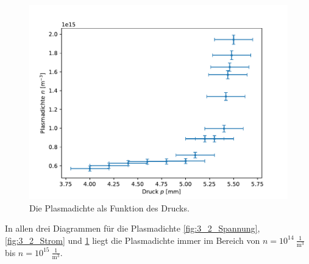 \begin{figure}[H]
\centering
\includegraphics[scale=0.6]{3_2_Druck.pdf}
\caption{Die Plasmadichte als Funktion des Drucks.}
\label{fig:3_2_Druck}
\end{figure}
In allen drei Diagrammen für die Plasmadichte  \ref{fig:3_2_Spannung}, \ref{fig:3_2_Strom} und  \ref{fig:3_2_Druck} liegt die Plasmadichte immer im Bereich von $n=10^{14}\ \frac{1}{\mathrm{m}^3}$ bis  $n=10^{15}\ \frac{1}{\mathrm{m}^3}$.
